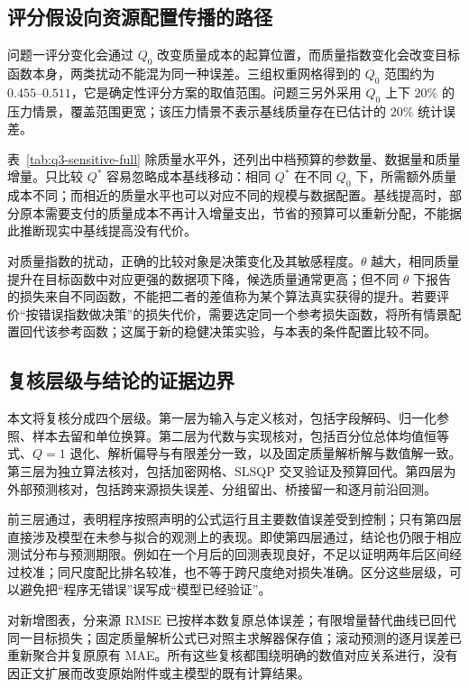 \subsection{评分假设向资源配置传播的路径}
问题一评分变化会通过 $Q_0$ 改变质量成本的起算位置，而质量指数变化会改变目标函数本身，两类扰动不能混为同一种误差。三组权重网格得到的 $Q_0$ 范围约为 $0.455$--$0.511$，它是确定性评分方案的取值范围。问题三另外采用 $Q_0$ 上下 $20\%$ 的压力情景，覆盖范围更宽；该压力情景不表示基线质量存在已估计的 $20\%$ 统计误差。

表~\ref{tab:q3-sensitive-full} 除质量水平外，还列出中档预算的参数量、数据量和质量增量。只比较 $Q^*$ 容易忽略成本基线移动：相同 $Q^*$ 在不同 $Q_0$ 下，所需额外质量成本不同；而相近的质量水平也可以对应不同的规模与数据配置。基线提高时，部分原本需要支付的质量成本不再计入增量支出，节省的预算可以重新分配，不能据此推断现实中基线提高没有代价。



对质量指数的扰动，正确的比较对象是决策变化及其敏感程度。$\theta$ 越大，相同质量提升在目标函数中对应更强的数据项下降，候选质量通常更高；但不同 $\theta$ 下报告的损失来自不同函数，不能把二者的差值称为某个算法真实获得的提升。若要评价“按错误指数做决策”的损失代价，需要选定同一个参考损失函数，将所有情景配置回代该参考函数；这属于新的稳健决策实验，与本表的条件配置比较不同。

\subsection{复核层级与结论的证据边界}
本文将复核分成四个层级。第一层为输入与定义核对，包括字段解码、归一化参照、样本去留和单位换算。第二层为代数与实现核对，包括百分位总体均值恒等式、$Q=1$ 退化、解析偏导与有限差分一致，以及固定质量解析解与数值解一致。第三层为独立算法核对，包括加密网格、SLSQP 交叉验证及预算回代。第四层为外部预测核对，包括跨来源损失误差、分组留出、桥接留一和逐月前沿回测。

前三层通过，表明程序按照声明的公式运行且主要数值误差受到控制；只有第四层直接涉及模型在未参与拟合的观测上的表现。即使第四层通过，结论也仍限于相应测试分布与预测期限。例如在一个月后的回测表现良好，不足以证明两年后区间经过校准；同尺度配比排名较准，也不等于跨尺度绝对损失准确。区分这些层级，可以避免把“程序无错误”误写成“模型已经验证”。

对新增图表，分来源 RMSE 已按样本数复原总体误差；有限增量替代曲线已回代同一目标损失；固定质量解析公式已对照主求解器保存值；滚动预测的逐月误差已重新聚合并复原原有 MAE。所有这些复核都围绕明确的数值对应关系进行，没有因正文扩展而改变原始附件或主模型的既有计算结果。
